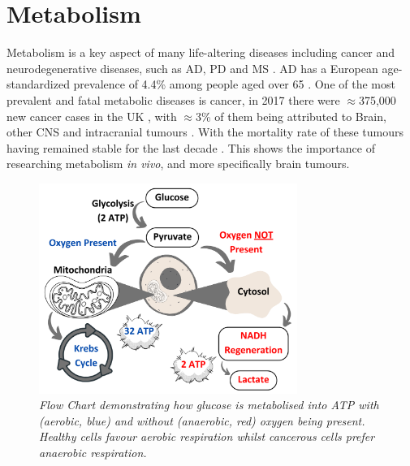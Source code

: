 \section{Metabolism}

Metabolism is a key aspect of many life-altering diseases including cancer and neurodegenerative diseases, such as \ac{AD}, \ac{PD} and \ac{MS} \cite{Gialleonardo2016TheImaging}. \ac{AD} has a European age-standardized prevalence of 4.4\% among people aged over 65 \cite{Qiu2009EpidemiologyIntervention}. One of the most prevalent and fatal metabolic diseases is cancer, in 2017 there were $\approx$375,000 new cancer cases in the UK \cite{CancerUK}, with $\approx$3\% of them being attributed to Brain, other CNS and intracranial tumours \cite{BrainUK}. With the mortality rate of these tumours having remained stable for the last decade \cite{BrainUK}. This shows the importance of researching metabolism \textit{in vivo}, and more specifically brain tumours.

\begin{figure}
    \centering
    \includegraphics[width=0.75\textwidth]{Figures/Intro/Metabolism.png}
    \caption{\textit{Flow Chart demonstrating how glucose is metabolised into \ac{ATP} with (aerobic, blue) and without (anaerobic, red) oxygen being present. Healthy cells favour aerobic respiration whilst cancerous cells prefer anaerobic respiration.}}
    \label{fig:intro:Metabolism}
\end{figure}

